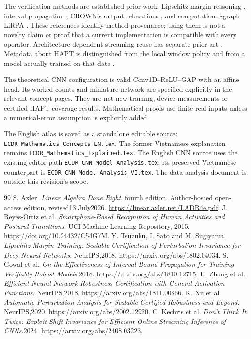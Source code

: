 \documentclass[11pt,a4paper]{article}
\newcommand{\code}[1]{{\small\ttfamily\nolinkurl{#1}}}
\begin{document}
The verification methods are established prior work: Lipschitz-margin
reasoning \cite{lmt}, interval propagation \cite{ibp}, CROWN's output
relaxations \cite{crown}, and computational-graph LiRPA \cite{lirpa}.
These references identify method provenance; using them is not a novelty
claim or proof that a current implementation is compatible with every
operator. Architecture-dependent streaming reuse has separate prior art
\cite{streaminnc}. Metadata about HAPT is distinguished from the local
window policy and from a model actually trained on that data \cite{hapt}.

The theoretical CNN configuration is valid Conv1D--ReLU--GAP with an affine
head. Its worked counts and miniature network are specified explicitly in
the relevant concept pages. They are not new training, device measurements
or certified HAPT coverage results. Mathematical proofs use finite real
inputs unless a numerical-error assumption is explicitly added.

The English atlas is saved as a standalone editable source:
\code{ECDR_Mathematics_Concepts_EN.tex}. The former Vietnamese explanation
remains \code{ECDR_Mathematics_Explained.tex}. The English CNN source uses
the existing editor path \code{ECDR_CNN_Model_Analysis.tex}; its preserved
Vietnamese counterpart is \code{ECDR_CNN_Model_Analysis_VI.tex}.
The data-analysis document is outside this revision's scope.

\begin{thebibliography}{99}
 S. Axler. \emph{Linear Algebra Done Right}, fourth edition.
Author-hosted open-access edition, revised13 July2026.
\url{https://linear.axler.net/LADR4e.pdf}.
 J. Reyes-Ortiz et al. \emph{Smartphone-Based Recognition of
Human Activities and Postural Transitions}. UCI Machine Learning Repository,
2015. \url{https://doi.org/10.24432/C54G7M}.
 Y. Tsuzuku, I. Sato and M. Sugiyama. \emph{Lipschitz-Margin
Training: Scalable Certification of Perturbation Invariance for Deep Neural
Networks}. NeurIPS,2018. \url{https://arxiv.org/abs/1802.04034}.
 S. Gowal et al. \emph{On the Effectiveness of Interval Bound
Propagation for Training Verifiably Robust Models}.2018.
\url{https://arxiv.org/abs/1810.12715}.
 H. Zhang et al. \emph{Efficient Neural Network Robustness
Certification with General Activation Functions}. NeurIPS,2018.
\url{https://arxiv.org/abs/1811.00866}.
 K. Xu et al. \emph{Automatic Perturbation Analysis for Scalable
Certified Robustness and Beyond}. NeurIPS,2020.
\url{https://arxiv.org/abs/2002.12920}.
 C. Kechris et al. \emph{Don't Think It Twice: Exploit Shift
Invariance for Efficient Online Streaming Inference of CNNs}.2024.
\url{https://arxiv.org/abs/2408.03223}.
\end{thebibliography}
\end{document}

